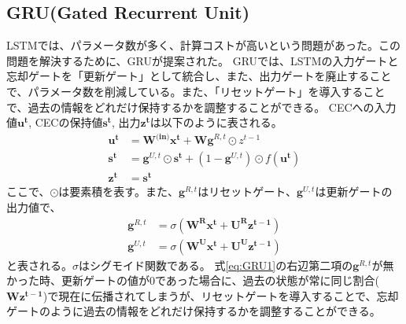 \documentclass{ltjsarticle}
\begin{document}
\subsection{GRU(Gated Recurrent Unit)}
LSTMでは、パラメータ数が多く、計算コストが高いという問題があった。この問題を解決するために、GRUが提案された。
GRUでは、LSTMの入力ゲートと忘却ゲートを「更新ゲート」として統合し、また、出力ゲートを廃止することで、パラメータ数を削減している。また、「リセットゲート」を導入することで、過去の情報をどれだけ保持するかを調整することができる。
CECへの入力値$\mathbf{u^t}$, CECの保持値$\mathbf{s^{t}}$, 出力$\mathbf{z^t}$は以下のように表される。
\begin{align}
  \label{eq:GRU1}
  \mathbf{u^t} &=\mathbf{W^{\text{(in)}}}\mathbf{x^t} + \mathbf{Wg}^{R,t} \odot z^{t-1}\\
  \mathbf{s^t} &= \mathbf{g}^{U,t} \odot \mathbf{s^t} + (1 - \mathbf{g}^{U,t}) \odot f(\mathbf{u^t})\\
  \mathbf{z^t} &= \mathbf{s^t}
\end{align}
ここで、$\odot$は要素積を表す。また、$\mathbf{g}^{R,t}$はリセットゲート、$\mathbf{g}^{U,t}$は更新ゲートの出力値で、
\begin{align}
  \mathbf{g}^{R,t} &= \sigma(\mathbf{W^R}\mathbf{x^t} + \mathbf{U^R}\mathbf{z^{t-1}})\\
  \mathbf{g}^{U,t} &= \sigma(\mathbf{W^U}\mathbf{x^t} + \mathbf{U^U}\mathbf{z^{t-1}})
\end{align}
と表される。$\sigma$はシグモイド関数である。
式\eqref{eq:GRU1}の右辺第二項の$\mathbf{g}^{R,t}$が無かった時、更新ゲートの値が0であった場合に、過去の状態が常に同じ割合($\mathbf{Wz^{t-1}}$)で現在に伝播されてしまうが、リセットゲートを導入することで、忘却ゲートのように過去の情報をどれだけ保持するかを調整することができる。
\end{document}
